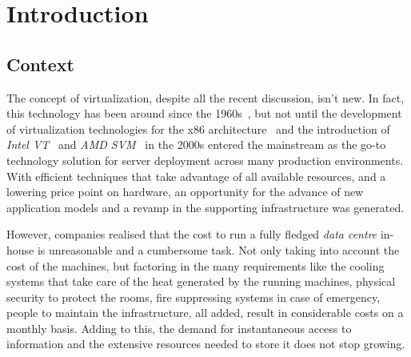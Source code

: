 \newcommand{\novathesis}{\emph{novathesis}}
\newcommand{\novathesisclass}{\texttt{novathesis.cls}}


\chapter{Introduction}
\label{cha:introduction}



\section{Context} %
\label{sec:context}

The concept of virtualization, despite all the recent discussion, isn’t new. In fact, this technology has been around since the 1960s~\cite{Buzen1973}, but not until the development of virtualization technologies for the x86 architecture~\cite{Agesen2010} and the introduction of \textit{Intel VT}~\cite{Intel2010} and \textit{AMD SVM}~\cite{AMD2010} in the 2000s entered the mainstream as the go-to technology solution for server deployment across many production environments. \\
%
With efficient techniques that take advantage of all available resources, and a lowering price point on hardware, an opportunity for the advance of new application models and a revamp in the supporting infrastructure was generated. 

However, companies realised that the cost to run a fully fledged \textit{data centre} in-house is unreasonable and a cumbersome task. Not only taking into account the cost of the machines, but factoring in the many requirements like the cooling systems that take care of the heat generated by the running machines, physical security to protect the rooms, fire suppressing systems in case of emergency, people to maintain the infrastructure, all added, result in considerable costs on a monthly basis.
Adding to this, the demand for instantaneous access to information and the extensive resources needed to store it does not stop growing.
%

